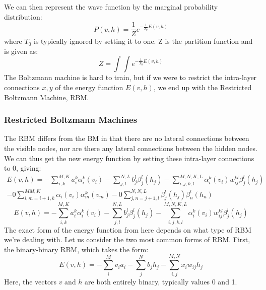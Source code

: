 \documentclass[12pt]{article}
\begin{document}
{\newline
We can then represent the wave function by the marginal probability distribution:
\begin{equation*}
    P(v, h) = \frac{1}{Z} e^{-\frac{1}{T_0} E(v, h)}
\end{equation*}
where $T_0$ is typically ignored by setting it to one. Z is the partition function and is given as:
\begin{equation*}
    Z = \int \int e^{-\frac{1}{T_0} E(v, h)}
\end{equation*}
\newline
The Boltzmann machine is hard to train, but if we were to restrict the intra-layer connections $x, y$ of the energy function $E(v, h)$, we end up with the Restricted Boltzmann Machine, RBM.
\subsubsection{Restricted Boltzmann Machines}
The RBM differs from the BM in that there are no lateral connections between the visible nodes, nor are there any lateral connections between the hidden nodes. We can thus get the new energy function by setting these intra-layer connections to 0, giving:
\begin{equation*}
    \begin{split}
    E(v, h) = - \sum_{i,k}^{M,K} a_i^k \alpha_i^k (v_i) - \sum_{j, l}^{N, L} b_j^l \beta_j^l (h_j) - \sum_{i,j,k,l}^{M,N,K,L} \alpha_i^k (v_i) w_{ij}^{kl} \beta_j^l (h_j) \\
    - 0\sum_{i,m=i+1, k}^{MM, K} \alpha_i (v_i) \alpha_m^k (v_m) - 0\sum_{j,n=j+1, l}^{N,N,L} \beta_j^l (h_j) \beta_{n}^l (h_n)
\end{split}
\end{equation*}
\begin{equation*}
    E(v, h) = - \sum_{i,k}^{M,K} a_i^k \alpha_i^k (v_i) - \sum_{j, l}^{N, L} b_j^l \beta_j^l (h_j) - \sum_{i,j,k,l}^{M,N,K,L} \alpha_i^k (v_i) w_{ij}^{kl} \beta_j^l (h_j)
\end{equation*}
The exact form of the energy function from here depends on what type of RBM we're dealing with. Let us consider the two most common forms of RBM.
\newline
First, the binary-binary RBM, which takes the form:
\begin{equation*}
    E(v, h) = - \sum_i^M v_i a_i - \sum_j^N b_j h_j - \sum_{i,j}^{M,N} x_i w_{ij}h_j
\end{equation*}
Here, the vectors $v$ and $h$ are both entirely binary, typically values 0 and 1.
}
\end{document}
